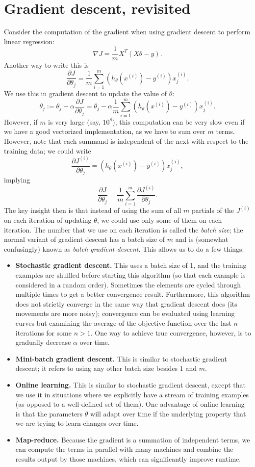 \documentclass{article}
\begin{document}
\section{Gradient descent, revisited}
Consider the computation of the gradient when using gradient descent to perform linear regression:
$$\nabla J = \frac{1}{m} X^T(X\theta - y).$$
Another way to write this is
$$\frac{\partial J}{\partial \theta_j} = \frac{1}{m} \sum_{i=1}^m (h_{\theta}(x^{(i)}) - y^{(i)})x^{(i)}_j.$$
We use this in gradient descent to update the value of $\theta$:
$$\theta_j := \theta_j - \alpha \frac{\partial J}{\partial \theta_j} = \theta_j - \alpha\frac{1}{m} \sum_{i=1}^m (h_{\theta}(x^{(i)}) - y^{(i)})x^{(i)}_j.$$
However, if $m$ is very large (say, $10^8$), this computation can be very slow even if we have a good vectorized implementation, as we have to sum over $m$ terms. However, note that each summand is independent of the next with respect to the training data; we could write
$$\frac{\partial J^{(i)}}{\partial \theta_j} = (h_{\theta}(x^{(i)}) - y^{(i)})x^{(i)}_j,$$
implying
$$\frac{\partial J}{\partial \theta_j} = \frac{1}{m} \sum_{i=1}^m \frac{\partial J^{(i)}}{\partial \theta_j}.$$
The key insight then is that instead of using the sum of all $m$ partials of the $J^{(i)}$ on each iteration of updating $\theta$, we could use only some of them on each iteration. The number that we use on each iteration is called the \emph{batch size}; the normal variant of gradient descent has a batch size of $m$ and is (somewhat confusingly) known as \emph{batch gradient descent}. This allows us to do a few things:
\begin{itemize}
\item \textbf{Stochastic gradient descent.} This uses a batch size of 1, and the training examples are shuffled before starting this algorithm (so that each example is considered in a random order). Sometimes the elements are cycled through multiple times to get a better convergence result. Furthermore, this algorithm does not strictly converge in the same way that gradient descent does (its movements are more noisy); convergence can be evaluated using learning curves but examining the average of the objective function over the last $n$ iterations for some $n > 1$. One way to achieve true convergence, however, is to gradually decrease $\alpha$ over time.
\item \textbf{Mini-batch gradient descent.} This is similar to stochastic gradient descent; it refers to using any other batch size besides $1$ and $m$.
\item \textbf{Online learning.} This is similar to stochastic gradient descent, except that we use it in situations where we explicitly have a stream of training examples (as opposed to a well-defined set of them). One advantage of online learning is that the parameters $\theta$ will adapt over time if the underlying property that we are trying to learn changes over time.
\item \textbf{Map-reduce.} Because the gradient is a summation of independent terms, we can compute the terms in parallel with many machines and combine the results output by those machines, which can significantly improve runtime.
\end{itemize}
\end{document}
